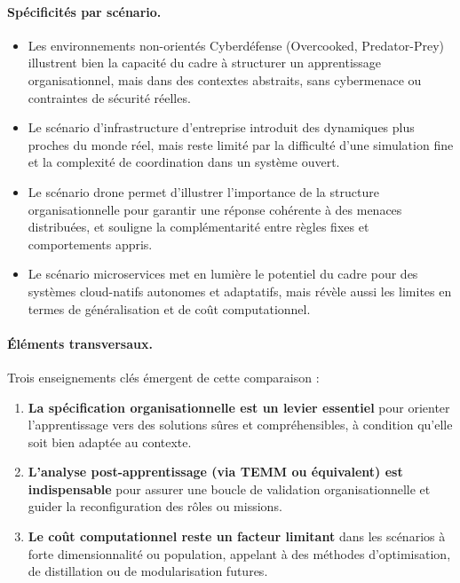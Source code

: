 \paragraph{Spécificités par scénario.}
\begin{itemize}
  \item Les environnements non-orientés Cyberdéfense (Overcooked, Predator-Prey) illustrent bien la capacité du cadre à structurer un apprentissage organisationnel, mais dans des contextes abstraits, sans cybermenace ou contraintes de sécurité réelles.
  \item Le scénario d’infrastructure d’entreprise introduit des dynamiques plus proches du monde réel, mais reste limité par la difficulté d’une simulation fine et la complexité de coordination dans un système ouvert.
  \item Le scénario drone permet d’illustrer l’importance de la structure organisationnelle pour garantir une réponse cohérente à des menaces distribuées, et souligne la complémentarité entre règles fixes et comportements appris.
  \item Le scénario microservices met en lumière le potentiel du cadre pour des systèmes cloud-natifs autonomes et adaptatifs, mais révèle aussi les limites en termes de généralisation et de coût computationnel.
\end{itemize}

\paragraph{Éléments transversaux.} Trois enseignements clés émergent de cette comparaison :
\begin{enumerate}
  \item \textbf{La spécification organisationnelle est un levier essentiel} pour orienter l’apprentissage vers des solutions sûres et compréhensibles, à condition qu’elle soit bien adaptée au contexte.
  \item \textbf{L’analyse post-apprentissage (via TEMM ou équivalent) est indispensable} pour assurer une boucle de validation organisationnelle et guider la reconfiguration des rôles ou missions.
  \item \textbf{Le coût computationnel reste un facteur limitant} dans les scénarios à forte dimensionnalité ou population, appelant à des méthodes d’optimisation, de distillation ou de modularisation futures.
\end{enumerate}

\

